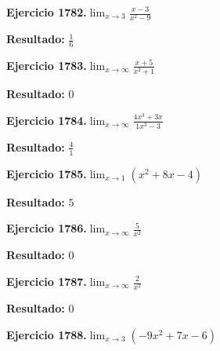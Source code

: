 \documentclass[10pt,a4paper]{article}
\begin{document}
\begin{ejbox}
\textbf{Ejercicio 1782.}\quad $\lim_{x\to 3} \frac{x-3}{x^2-9}$
\end{ejbox}

\begin{solbox}
\textbf{Resultado:} \(\displaystyle \frac{1}{6}\)
\end{solbox}

\newpage
\begin{ejbox}
\textbf{Ejercicio 1783.}\quad $\lim_{x\to \infty} \frac{x + 5}{x^2 + 1}$
\end{ejbox}

\begin{solbox}
\textbf{Resultado:} \(\displaystyle 0\)
\end{solbox}

\begin{ejbox}
\textbf{Ejercicio 1784.}\quad $\lim_{x\to \infty} \frac{4x^3 + 3x}{1x^3 - 3}$
\end{ejbox}

\begin{solbox}
\textbf{Resultado:} \(\displaystyle \frac{4}{1}\)
\end{solbox}

\begin{ejbox}
\textbf{Ejercicio 1785.}\quad $\lim_{x\to 1} (x^2 +8x -4)$
\end{ejbox}

\begin{solbox}
\textbf{Resultado:} \(\displaystyle 5\)
\end{solbox}

\newpage
\begin{ejbox}
\textbf{Ejercicio 1786.}\quad $\lim_{x\to \infty} \frac{5}{x^2}$
\end{ejbox}

\begin{solbox}
\textbf{Resultado:} \(\displaystyle 0\)
\end{solbox}

\begin{ejbox}
\textbf{Ejercicio 1787.}\quad $\lim_{x\to \infty} \frac{2}{x^2}$
\end{ejbox}

\begin{solbox}
\textbf{Resultado:} \(\displaystyle 0\)
\end{solbox}

\begin{ejbox}
\textbf{Ejercicio 1788.}\quad $\lim_{x\to 3} (-9x^2 +7x -6)$
\end{ejbox}
\end{document}
